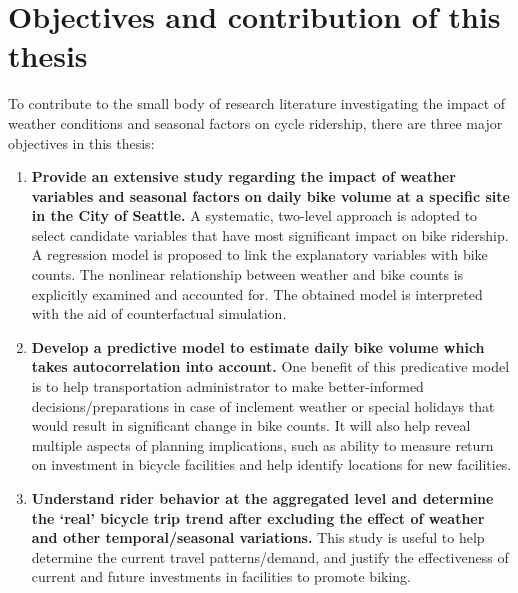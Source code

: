 \documentclass [11pt, proquest] {uwthesis}[2015/03/03]
\begin{document}
\section{Objectives and contribution of this thesis}
To contribute to the small body of research literature investigating the impact of weather conditions and seasonal factors on cycle ridership, there are three major objectives in this thesis:
\begin{enumerate}
\item \textbf{Provide an extensive study regarding the impact of weather variables and seasonal factors on daily bike volume at a specific site in the City of Seattle.} A systematic, two-level approach is adopted to select candidate variables that have most significant impact on bike ridership. A regression model is proposed to link the explanatory variables with bike counts. The nonlinear relationship between weather and bike counts is explicitly examined and accounted for. The obtained model is interpreted with the aid of counterfactual simulation. 
\item \textbf{Develop a predictive model to estimate daily bike volume which takes autocorrelation into account.} One benefit of this predicative model is to help transportation administrator to make better-informed decisions/preparations in case of inclement weather or special holidays that would result in significant change in bike counts. It will also help reveal multiple aspects of planning implications, such as ability to measure return on investment in bicycle facilities and help identify locations for new facilities. 
\item \textbf{Understand rider behavior at the aggregated level and determine the `real' bicycle trip trend after excluding the effect of weather and other temporal/seasonal variations.} This study is useful to help determine the current travel patterns/demand, and justify the effectiveness of current and future investments in facilities to promote biking.
\end{enumerate}
\end{document}

